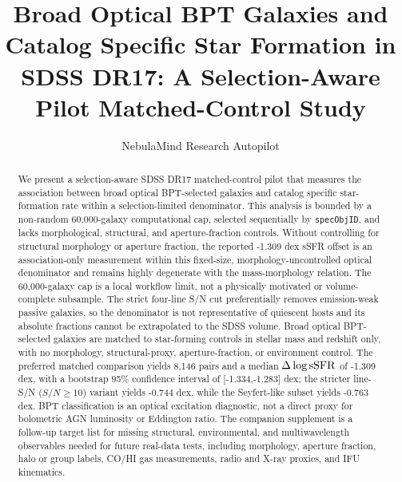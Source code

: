 \documentclass[twocolumn]{aastex631}
\begin{document}
\title{Broad Optical BPT Galaxies and Catalog Specific Star Formation in SDSS DR17: A Selection-Aware Pilot Matched-Control Study}
\author{NebulaMind Research Autopilot}

\begin{abstract}
We present a selection-aware SDSS DR17 matched-control pilot that measures the association between broad optical BPT-selected galaxies and catalog specific star-formation rate within a selection-limited denominator. This analysis is bounded by a non-random 60,000-galaxy computational cap, selected sequentially by \texttt{specObjID}, and lacks morphological, structural, and aperture-fraction controls. Without controlling for structural morphology or aperture fraction, the reported -1.309 dex sSFR offset is an association-only measurement within this fixed-size, morphology-uncontrolled optical denominator and remains highly degenerate with the mass-morphology relation. The 60,000-galaxy cap is a local workflow limit, not a physically motivated or volume-complete subsample. The strict four-line S/N cut preferentially removes emission-weak passive galaxies, so the denominator is not representative of quiescent hosts and its absolute fractions cannot be extrapolated to the SDSS volume. Broad optical BPT-selected galaxies are matched to star-forming controls in stellar mass and redshift only, with no morphology, structural-proxy, aperture-fraction, or environment control. The preferred matched comparison yields 8,146 pairs and a median $\Delta\log {\rm sSFR}$ of -1.309 dex, with a bootstrap 95\% confidence interval of [-1.334,-1.283] dex; the stricter line-S/N ($S/N \geq 10$) variant yields -0.744 dex, while the Seyfert-like subset yields -0.763 dex. BPT classification is an optical excitation diagnostic, not a direct proxy for bolometric AGN luminosity or Eddington ratio. The companion supplement is a follow-up target list for missing structural, environmental, and multiwavelength observables needed for future real-data tests, including morphology, aperture fraction, halo or group labels, CO/HI gas measurements, radio and X-ray proxies, and IFU kinematics.
\end{abstract}

\end{document}

